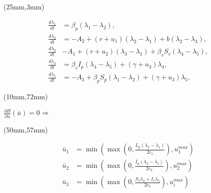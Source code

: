 \begin{frame}[plain]
	\begin{textblock*}{80mm}(25mm,3mm)
		\begin{greenbox}{}
			\begin{align*}
			\frac{d\lambda_1}{dt} &=\beta_p (\lambda_1-\lambda_2),\\
			\frac{d\lambda_2}{dt} &=-A_2+(r+u_1)(\lambda_2-\lambda_1)+b(\lambda_2-\lambda_3),\\
			\frac{d\lambda_3}{dt} &-A_1+(r+u_2)(\lambda_3-\lambda_1)+\beta_vS_v(\lambda_4-\lambda_5),\\
			\frac{d\lambda_4}{dt} &=\beta_v I_p(\lambda_4-\lambda_5)+(\gamma+u_3)\lambda_4,\\
			\frac{d\lambda_5}{dt} &=-A_3+\beta_p S_p(\lambda_1-\lambda_2)+(\gamma+u_3)\lambda_5,				
			\end{align*}
		\end{greenbox}	
	\end{textblock*}

	\begin{textblock*}{32mm}(10mm,72mm)
		\begin{yellowbox}{}
			$\frac{\partial H}{\partial u}(\bar{u})=0 \Rightarrow$
		\end{yellowbox}
	\end{textblock*}

	\begin{textblock*}{70mm}(50mm,57mm)
		\begin{yellowbox}{}
			\begin{align*}
				\bar{u}_1&=\min\left(\max\left(0,\frac{L_p(\lambda_2-\lambda_1)}{2c_1}\right),u_1^{max}\right)\\
				\bar{u}_2&=\min\left(\max\left(0,\frac{I_p(\lambda_3-\lambda_1)}{2c_2}\right),u_2^{max}\right)\\
				\bar{u}_3&=\min\left(\max\left(0,\frac{S_v\lambda_4+I_v\lambda_5}{2c_3}\right),u^{max}_i\right)
		\end{align*}
		\end{yellowbox}
		
	\end{textblock*}
	
\end{frame}
